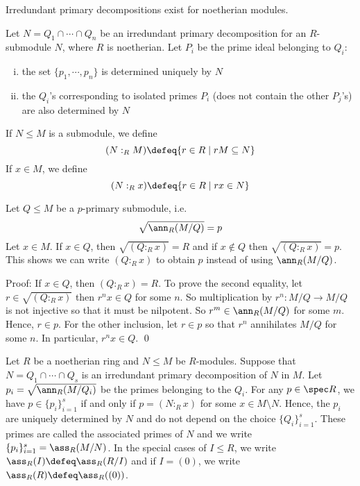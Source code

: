 \begin{cor}
Irredundant primary decompositions exist for noetherian modules.
\end{cor}

\begin{thmm}
Let $N=Q_1 \cap \cdots \cap Q_n$ be an irredundant primary decomposition for an $R$-submodule $N$, where $R$ is noetherian. Let $P_i$ be the prime ideal belonging to $Q_i$:
\begin{enumerate}[(i)]
\item the set $\{p_1,\cdots,p_n\}$ is determined uniquely by $N$
\item the $Q_i$'s corresponding to isolated primes $P_i$ (does not contain the other $P_j$'s) are also determined by $N$
\end{enumerate}
\end{thmm}

\begin{dfn}
If $N \leq M$ is a submodule, we define
\[
(N:_R M) \defeq \{r \in R \;|\; rM \subseteq N\}
\]
If $x \in M$, we define
\[
(N:_R x) \defeq \{r \in R \;|\; rx \in N\}
\]
\end{dfn}

\begin{lem}
Let $Q \leq M$ be a $p$-primary submodule, i.e. 
\[
\sqrt{\ann_R(M/Q)}=p
\]
Let $x \in M$. If $x \in Q$, then $\sqrt{(Q:_R x)}=R$ and if $x \notin Q$ then $\sqrt{(Q:_R x)}=p$. This shows we can write $(Q:_R x)$ to obtain $p$ instead of using $\ann_R(M/Q)$.
\end{lem}

\noindent Proof: If $x \in Q$, then $(Q:_R x)=R$. To prove the second equality, let $r \in \sqrt{(Q:_Rx)}$ then $r^nx \in Q$ for some $n$. So multiplication by $r^n: M/Q \to M/Q$ is not injective so that it must be nilpotent. So $r^m \in \ann_R(M/Q)$ for some $m$. Hence, $r \in p$. For the other inclusion, let $r \in p$ so that $r^n$ annihilates $M/Q$ for some $n$. In particular, $r^nx \in Q$. \qed \\

\begin{thmm}
Let $R$ be a noetherian ring and $N \leq M$ be $R$-modules. Suppose that $N=Q_1 \cap \cdots \cap Q_s$ is an irredundant primary decomposition of $N$ in $M$. Let $p_i=\sqrt{\ann_R(M/Q_i)}$ be the primes belonging to the $Q_i$. For any $p \in \spec R$, we have $p \in \{p_i\}_{i=1}^s$ if and only if $p=(N:_R x)$ for some $x \in M \setminus N$. Hence, the $p_i$ are uniquely determined by $N$ and do not depend on the choice $\{Q_i\}_{i=1}^s$. These primes are called the associated primes of $N$ and we write $\{p_i\}_{i=1}^s= \ass_R(M/N)$. In the special cases of $I \leq R$, we write $\ass_R(I) \defeq \ass_R(R/I)$ and if $I=(0)$, we write $\ass_R(R)\defeq \ass_R((0))$.
\end{thmm}


